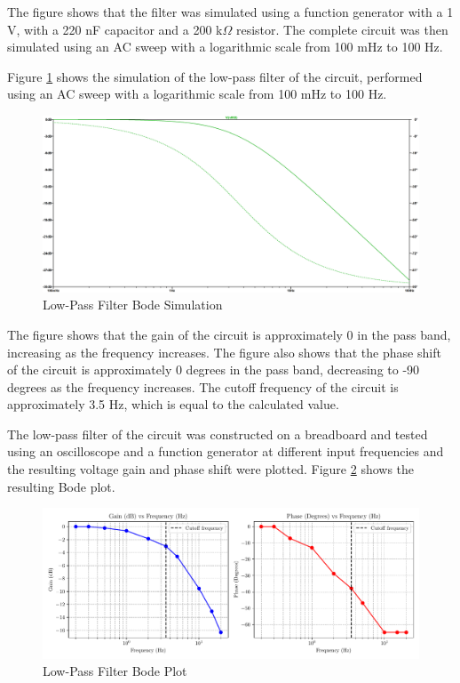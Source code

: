 \documentclass[CMPE]{KGCOEReport}
\begin{document}
The figure shows that the filter was simulated using a function generator with a 1 V, with a 220 nF capacitor and a 200 k$\Omega$ resistor. The complete circuit was then simulated using an AC sweep with a logarithmic scale from 100 mHz to 100 Hz.

Figure \ref{fig:lowPassSim} shows the simulation of the low-pass filter of the circuit, performed using an AC sweep with a logarithmic scale from 100 mHz to 100 Hz.

\begin{figure}[H]
    \centering
    \includegraphics[width=1\textwidth]{SimFreqLowPass.png}
    \caption{Low-Pass Filter Bode Simulation}
    \label{fig:lowPassSim}
\end{figure}

The figure shows that the gain of the circuit is approximately 0 in the pass band, increasing as the frequency increases. The figure also shows that the phase shift of the circuit is approximately 0 degrees in the pass band, decreasing to -90 degrees as the frequency increases. The cutoff frequency of the circuit is approximately 3.5 Hz, which is equal to the calculated value.

The low-pass filter of the circuit was constructed on a breadboard and tested using an oscilloscope and a function generator at different input frequencies and the resulting voltage gain and phase shift were plotted. Figure \ref{fig:lowPassBode} shows the resulting Bode plot.

\begin{figure}[H]
    \centering
    \includegraphics[width=1\textwidth]{low_pass_plot.pdf}
    \caption{Low-Pass Filter Bode Plot}
    \label{fig:lowPassBode}
\end{figure}
\end{document}
